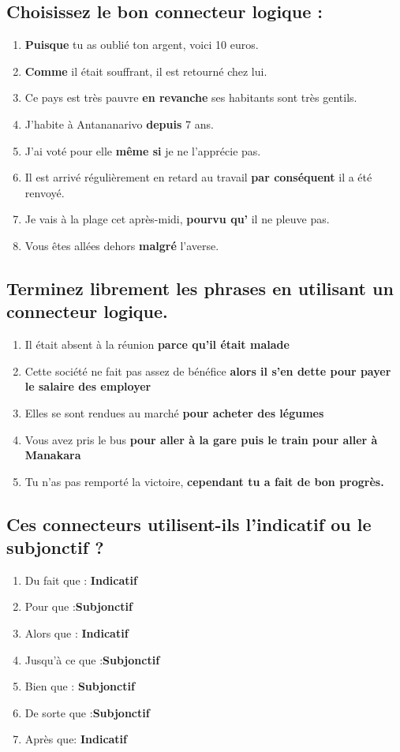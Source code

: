 \documentclass[12pt]{article}
\newcommand{\colo}[1]{{\color{blue}\textbf{#1}}}
\begin{document}
\subsection{Choisissez le bon connecteur logique : }
\begin{enumerate}
	\item \colo{Puisque} tu as oublié ton argent, voici 10 euros.
	\item \colo{Comme} il était souffrant, il est retourné chez lui.
	\item Ce pays est très pauvre \colo{en revanche} ses habitants sont très gentils.
	\item J’habite à Antananarivo \colo{depuis} 7 ans.
	\item J’ai voté pour elle \colo{même si} je ne l’apprécie pas.
	\item Il est arrivé régulièrement en retard au travail \colo{par conséquent} il a été renvoyé.
	\item Je vais à la plage cet après-midi, \colo{pourvu qu’} il ne pleuve pas. \item Vous êtes allées dehors \colo{malgré} l’averse.
\end{enumerate}

\subsection{Terminez librement les phrases en utilisant un connecteur logique.}
\begin{enumerate}
	\item Il était absent à la réunion \colo{parce qu'il était malade}
	\item Cette société ne fait pas assez de bénéfice \colo{alors il s'en dette pour payer le salaire des employer}
	\item Elles se sont rendues au marché \colo{pour acheter des légumes}
	\item Vous avez pris le bus \colo{pour aller à la gare puis le train pour aller à Manakara}
	\item Tu n’as pas remporté la victoire, \colo{cependant tu a fait de bon progrès.}
\end{enumerate}

\subsection{Ces connecteurs utilisent-ils l'indicatif ou le subjonctif ?}
\begin{enumerate}
	\item Du fait que : \colo{Indicatif}
	\item Pour que :\colo{Subjonctif}
	\item Alors que  : \colo{Indicatif}
	\item Jusqu'à ce que :\colo{Subjonctif}
	\item Bien que : \colo{Subjonctif}
	\item De sorte que :\colo{Subjonctif}
	\item Après que: \colo{Indicatif}
\end{enumerate}
\end{document}
